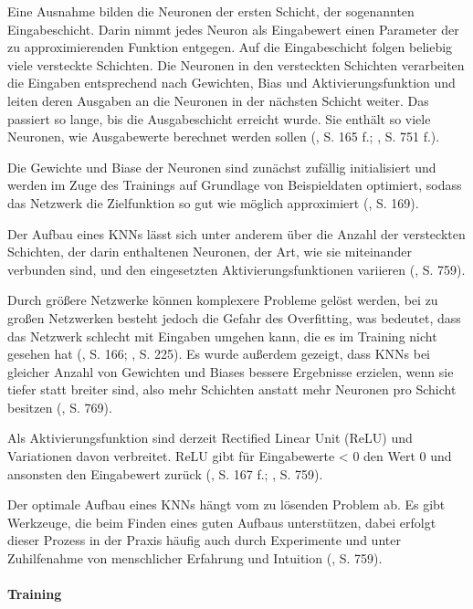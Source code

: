 Eine Ausnahme bilden die Neuronen der ersten Schicht, der sogenannten Eingabeschicht. Darin nimmt jedes Neuron als Eingabewert einen Parameter der zu approximierenden Funktion entgegen. Auf die Eingabeschicht folgen beliebig viele versteckte Schichten. Die Neuronen in den versteckten Schichten verarbeiten die Eingaben entsprechend nach Gewichten, Bias und Aktivierungsfunktion und leiten deren Ausgaben an die Neuronen in der nächsten Schicht weiter. Das passiert so lange, bis die Ausgabeschicht erreicht wurde. Sie enthält so viele Neuronen, wie Ausgabewerte berechnet werden sollen (\cite{Albrecht.2024}, S. 165 f.; \cite{Russell.2020}, S. 751 f.).

Die Gewichte und Biase der Neuronen sind zunächst zufällig initialisiert und werden im Zuge des Trainings auf Grundlage von Beispieldaten optimiert, sodass das Netzwerk die Zielfunktion so gut wie möglich approximiert (\cite{Albrecht.2024}, S. 169).


Der Aufbau eines KNNs lässt sich unter anderem über die Anzahl der versteckten Schichten, der darin enthaltenen Neuronen, der Art, wie sie miteinander verbunden sind, und den eingesetzten Aktivierungsfunktionen variieren (\cite{Russell.2020}, S. 759).

Durch größere Netzwerke können komplexere Probleme gelöst werden, bei zu großen Netzwerken besteht jedoch die Gefahr des Overfitting, was bedeutet, dass das Netzwerk schlecht mit Eingaben umgehen kann, die es im Training nicht gesehen hat (\cite{Albrecht.2024}, S. 166; \cite{Sutton.2018}, S. 225). Es wurde außerdem gezeigt, dass KNNs bei gleicher Anzahl von Gewichten und Biases bessere Ergebnisse erzielen, wenn sie tiefer statt breiter sind, also mehr Schichten anstatt mehr Neuronen pro Schicht besitzen (\cite{Russell.2020}, S. 769).

Als Aktivierungsfunktion sind derzeit Rectified Linear Unit (ReLU) und Variationen davon verbreitet. ReLU gibt für Eingabewerte < 0 den Wert 0 und ansonsten den Eingabewert zurück (\cite{Albrecht.2024}, S. 167 f.; \cite{Russell.2020}, S. 759).

Der optimale Aufbau eines KNNs hängt vom zu lösenden Problem ab. Es gibt Werkzeuge, die beim Finden eines guten Aufbaus unterstützen, dabei erfolgt dieser Prozess in der Praxis häufig auch durch Experimente und unter Zuhilfenahme von menschlicher Erfahrung und Intuition (\cite{Russell.2020}, S. 759).

\paragraph{Training}

